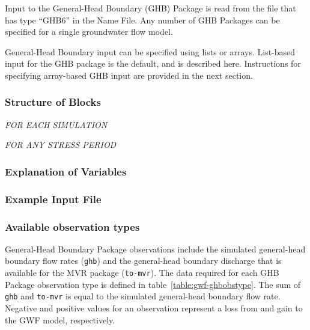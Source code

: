 Input to the General-Head Boundary (GHB) Package is read from the file that has type ``GHB6'' in the Name File.  Any number of GHB Packages can be specified for a single groundwater flow model.

General-Head Boundary input can be specified using lists or arrays.  List-based input for the GHB package is the default, and is described here.  Instructions for specifying array-based GHB input are provided in the next section.

\vspace{5mm}
\subsubsection{Structure of Blocks}
\vspace{5mm}

\noindent \textit{FOR EACH SIMULATION}


\vspace{5mm}
\noindent \textit{FOR ANY STRESS PERIOD}

\packageperioddescription

\vspace{5mm}
\subsubsection{Explanation of Variables}
\begin{description}

\end{description}

\vspace{5mm}
\subsubsection{Example Input File}


\vspace{5mm}
\subsubsection{Available observation types}
General-Head Boundary Package observations include the simulated general-head boundary flow rates (\texttt{ghb}) and the general-head boundary discharge that is available for the MVR package (\texttt{to-mvr}). The data required for each GHB Package observation type is defined in table~\ref{table:gwf-ghbobstype}. The sum of \texttt{ghb} and \texttt{to-mvr} is equal to the simulated general-head boundary flow rate. Negative and positive values for an observation represent a loss from and gain to the GWF model, respectively.


